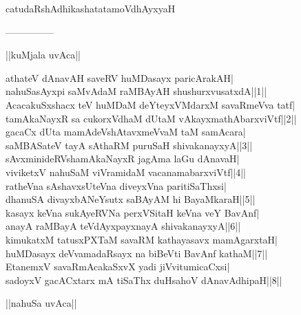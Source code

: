 \documentclass{article}
\begin{document}
\begin{center}
catudaRshAdhikashatatamoVdhAyxyaH
\end{center}

\begin{center}
---------------
\end{center}

\begin{center}
||kuMjala uvAca||
\end{center}

athateV dAnavAH saveRV huMDasayx paricArakAH|\\
nahuSasAyxpi saMvAdaM raMBAyAH shushurxvusatxdA||1||\\
AcacakuSxshacx teV huMDaM deYteyxVMdarxM savaRmeVva tatf|\\
tamAkaNayxR sa cukorxVdhaM dUtaM vAkayxmathAbarxviVtf||2||\\
gacaCx dUta mamAdeVshAtavxmeVvaM taM samAcara|\\
saMBASateV tayA sAthaRM puruSaH shivakanayxyA||3||\\
sAvxminideRVshamAkaNayxR jagAma laGu dAnavaH|\\
viviketxV nahuSaM viVramidaM vacanamabarxviVtf||4||\\
ratheVna sAshavxsUteVna diveyxVna paritiSaThxsi|\\
dhanuSA divayxbANeYsutx saBAyAM hi BayaMkaraH||5||\\
kasayx keVna sukAyeRVNa perxVSitaH keVna veY BavAnf|\\
anayA raMBayA teVdAyxpayxnayA shivakanayxyA||6||\\
kimukatxM tatusxPXTaM savaRM kathayasavx mamAgarxtaH|\\
huMDasayx deVvamadaRsayx na biBeVti BavAnf kathaM||7||\\
EtanemxV savaRmAcakaSxvX yadi jiVvitumicaCxsi|\\
sadoyxV gacACxtarx mA tiSaThx duHsahoV dAnavAdhipaH||8||\\

\begin{center}
||nahuSa uvAca||
\end{center}
\end{document}
